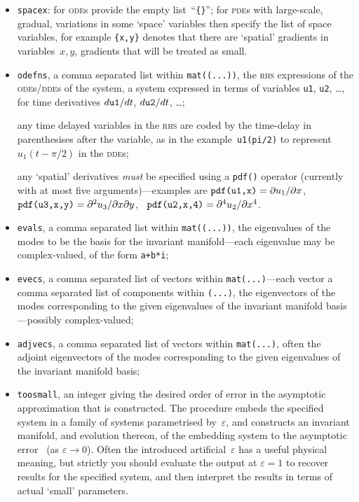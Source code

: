 \documentclass[11pt,a5paper]{article}
\def\eps{\varepsilon}
\begin{document}
\begin{itemize}

\item \verb|spacex|: for \textsc{ode}s provide the empty
list~``\verb|{}|''; for \textsc{pde}s with large-scale,
gradual, variations in some `space' variables then specify
the list of space variables, for example \verb|{x,y}|
denotes that there are `spatial' gradients in
variables~\(x,y\), gradients that will be treated as small.

\item \verb|odefns|, a comma separated list within
\verb|mat((...))|, the \textsc{rhs} expressions of the
\textsc{ode}s/\textsc{dde}s of the system, a system
expressed in terms of variables \verb|u1|, \verb|u2|,
\ldots, for time derivatives \(\de t{\tt u1}\), \(\de t{\tt
u2}\), \ldots;

any time delayed variables in the \textsc{rhs} are coded by
the time-delay in parenthesises after the variable, as in
the example~\verb|u1(pi/2)| to represent~\(u_1(t-\pi/2)\) in
the \textsc{dde}s;

any `spatial' derivatives \emph{must} be specified using a
\verb|pdf()| operator (currently with at most five
arguments)---examples are \(\verb|pdf(u1,x)|=\D x{u_1}\),
\  \(\verb|pdf(u3,x,y)|=\Dx xy{u_3}\),
\  \(\verb|pdf(u2,x,4)|=\Dn x4{u_2}\).

\item \verb|evals|, a comma separated list within
\verb|mat((...))|, the eigenvalues of the modes to be the
basis for the invariant manifold---each eigenvalue may be
complex-valued, of the form \verb|a+b*i|;

\item \verb|evecs|, a comma separated list of vectors within
\verb|mat(...)|---each vector a comma separated list of
components within \verb|(...)|, the eigenvectors of the
modes corresponding to the given eigenvalues of the
invariant manifold basis---possibly complex-valued;

\item \verb|adjvecs|, a comma separated list of vectors
within \verb|mat(...)|, often the adjoint eigenvectors of
the modes corresponding to the given eigenvalues of the
invariant manifold basis;  

\item \verb|toosmall|, an integer giving the desired order
of error in the asymptotic approximation that is
constructed.  The procedure embeds the specified system in a
family of systems parametrised by~\(\eps\), and constructs
an invariant manifold, and evolution thereon, of the
embedding system to the asymptotic error~\Ord{\eps^{\tt
toosmall}} (as \(\eps\to0\)). Often the introduced
artificial~\(\eps\) has a useful physical meaning, but
strictly you should evaluate the output at \(\eps=1\) to
recover results for the specified system, and then interpret
the results in terms of actual `small' parameters.

\end{itemize}
\end{document}
